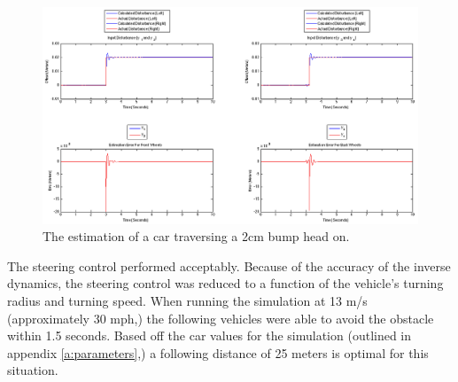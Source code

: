 \begin{figure}[t]
	\centering
	\includegraphics[width=1.0\textwidth]{figures/fullcar_2cm_straight_inverse.png}
	\caption{The estimation of a car traversing a 2cm bump head on.}
	\label{fig:fullcar_2cm}
\end{figure}

The steering control performed acceptably. Because of the accuracy of the inverse dynamics, the steering control was reduced to a function of the vehicle's turning radius and turning speed. When running the simulation at 13 m/s (approximately 30 mph,) the following vehicles were able to avoid the obstacle within 1.5 seconds. Based off the car values for the simulation (outlined in appendix \ref{a:parameters},) a following distance of 25 meters is optimal for this situation.


